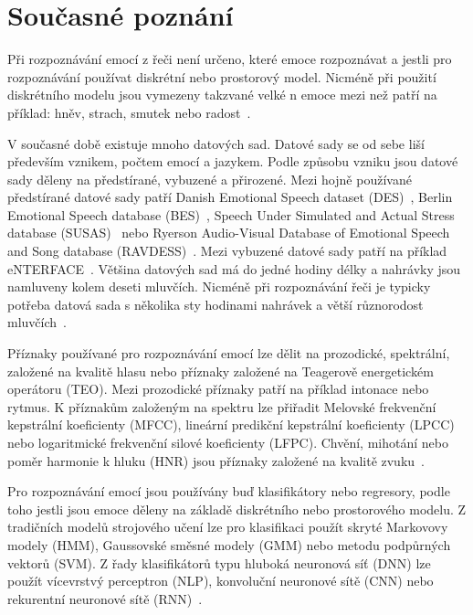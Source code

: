 \documentclass[FM,BP]{tulthesis}
\begin{document}
\section{Současné poznání} %
Při rozpoznávání emocí z řeči není určeno, které emoce rozpoznávat a jestli pro rozpoznávání používat diskrétní nebo prostorový model. Nicméně při použití diskrétního modelu jsou vymezeny takzvané velké n emoce mezi než patří na příklad: hněv, strach, smutek nebo radost~\cite{konar_chakraborty_2015}.

V současné době existuje mnoho datových sad. Datové sady se od sebe liší především vznikem, počtem emocí a jazykem. Podle způsobu vzniku jsou datové sady děleny na předstírané, vybuzené a přirozené. Mezi hojně používané předstírané datové sady patří Danish Emotional Speech dataset (DES)~\cite{DBLP:conf/interspeech/EngbergHAD97}, Berlin Emotional Speech database (BES)~\cite{bes_dataset}, Speech Under Simulated and Actual Stress database  (SUSAS)~\cite{DBLP:conf/interspeech/HansenB97} nebo Ryerson Audio-Visual Database of Emotional Speech and Song database \mbox{(RAVDESS)~\cite{ravdess}}. Mezi vybuzené datové sady patří na příklad \mbox{eNTERFACE~\cite{DBLP:conf/icde/MartinKMP06}}. Většina datových sad má do jedné hodiny délky a nahrávky jsou namluveny kolem deseti mluvčích. Nicméně při rozpoznávání řeči je typicky potřeba datová sada s několika sty hodinami nahrávek a větší různorodost mluvčích~\cite{konar_chakraborty_2015}.

Příznaky používané pro rozpoznávání emocí lze dělit na prozodické, spektrální, založené na kvalitě hlasu nebo příznaky založené na Teagerově energetickém operátoru (TEO). Mezi prozodické příznaky patří na příklad intonace nebo rytmus. K příznakům založeným na spektru lze přiřadit Melovské frekvenční kepstrální koeficienty (MFCC), lineární predikční kepstrální koeficienty (LPCC) nebo logaritmické frekvenční silové koeficienty (LFPC). Chvění, mihotání nebo poměr harmonie k hluku (HNR) jsou příznaky založené na kvalitě zvuku~\cite{DBLP:journals/speech/AkcayO20}.

Pro rozpoznávání emocí jsou používány buď klasifikátory nebo regresory, podle toho jestli jsou emoce děleny na základě diskrétního nebo prostorového modelu. Z tradičních modelů strojového učení lze pro klasifikaci použít skryté Markovovy modely (HMM), Gaussovské směsné modely (GMM) nebo metodu podpůrných vektorů (SVM). Z řady klasifikátorů typu hluboká neuronová síť (DNN) lze použít vícevrstvý perceptron (NLP), konvoluční neuronové sítě (CNN) nebo rekurentní neuronové sítě (RNN)~\cite{DBLP:journals/speech/AkcayO20}.
\end{document}
